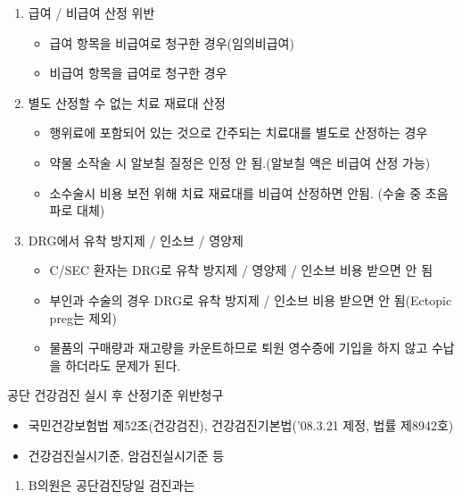 \begin{enumerate}[① ]
\item 급여 / 비급여 산정 위반
	\begin{itemize}\tightlist
	\item 급여 항목을 비급여로 청구한 경우(임의비급여)
	\item 비급여 항목을 급여로 청구한 경우
	\end{itemize}	
\item 별도 산정할 수 없는 치료 재료대 산정
	\begin{itemize}\tightlist
	\item 행위료에 포함되어 있는 것으로 간주되는 치료대를 별도로 산정하는 경우
	\item 약물 소작술 시 알보칠 질정은 인정 안 됨.(알보칠 액은 비급여 산정 가능)
	\item 소수술시 비용 보전 위해 치료 재료대를 비급여 산정하면 안됨. (수술 중 초음파로 대체)
	\end{itemize}	
\item DRG에서 유착 방지제 / 인소브 / 영양제
	\begin{itemize}\tightlist
	\item C/SEC 환자는 DRG로 유착 방지제 / 영양제 / 인소브 비용 받으면 안 됨
	\item 부인과 수술의 경우 DRG로 유착 방지제 / 인소브 비용 받으면 안 됨(Ectopic preg는 제외) 
	\item 물품의 구매량과 재고량을 카운트하므로 퇴원 영수증에 기입을 하지 않고 수납을 하더라도 문제가 된다.
	\end{itemize}	
\end{enumerate}  

\begin{commentbox}{공단 건강검진 실시 후 산정기준 위반청구}
\begin{description}\tightlist
\item[관련근거] 
\begin{itemize}\tightlist
\item 국민건강보험법 제52조(건강검진), 건강검진기본법('08.3.21 제정, 법률 제8942호)
\item 건강검진실시기준, 암검진실시기준 등
\end{itemize}
\item[부당사례]
\begin{enumerate}[1)]\tightlist
\item B의원은 공단검진당일 검진과는 
\end{enumerate}
\end{description}
\end{commentbox}

